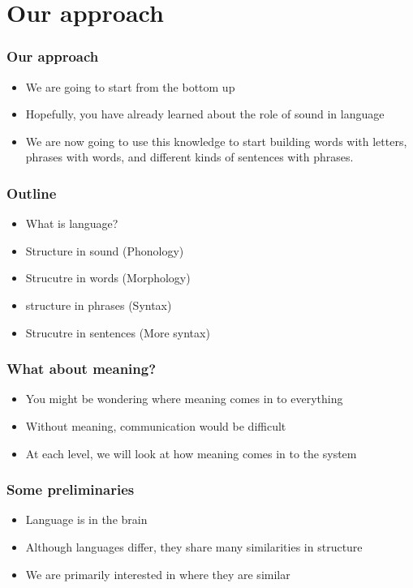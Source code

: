\documentclass{beamer}
\begin{document}
\section{Our approach}

\begin{frame}
\frametitle{Our approach}
	\begin{itemize}
	\item We are going to start from the bottom up
	\item Hopefully, you have already learned about the role of sound in language
	\item We are now going to use this knowledge to start building words with letters, phrases with words, and different kinds of sentences with phrases. 
	\end{itemize}
\end{frame}


\begin{frame}
\frametitle{Outline}
	\begin{itemize}
	\item What is language?
	\item Structure in sound (Phonology)
	\item Strucutre in words (Morphology)
	\item structure in phrases (Syntax)
	\item Strucutre in sentences (More syntax)
	\end{itemize}

\end{frame}


\begin{frame}
	\frametitle{What about meaning?}
	\begin{itemize}
	\item You might be wondering where meaning comes in to everything
	\item Without meaning, communication would be difficult
	\item At each level, we will look at how meaning comes in to the system
	\end{itemize}

\end{frame}



\begin{frame}
	\frametitle{Some preliminaries}
	\begin{itemize}
	\item Language is in the brain
	\item Although languages differ, they share many similarities in structure
	\item We are primarily interested in where they are similar

	\end{itemize}

\end{frame}
\end{document}
